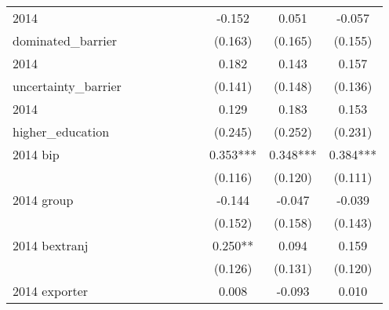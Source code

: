 \begin{table}[htbp]
\begin{tabular}{l*{9}{c}}
2014                &               &               &               &               &               &               &      -0.152   &       0.051   &      -0.057   \\
dominated\_barrier   &               &               &               &               &               &               &     (0.163)   &     (0.165)   &     (0.155)   \\
2014                &               &               &               &               &               &               &       0.182   &       0.143   &       0.157   \\
uncertainty\_barrier &               &               &               &               &               &               &     (0.141)   &     (0.148)   &     (0.136)   \\
2014                &               &               &               &               &               &               &       0.129   &       0.183   &       0.153   \\
higher\_education    &               &               &               &               &               &               &     (0.245)   &     (0.252)   &     (0.231)   \\
2014 bip            &               &               &               &               &               &               &       0.353***&       0.348***&       0.384***\\
                    &               &               &               &               &               &               &     (0.116)   &     (0.120)   &     (0.111)   \\
2014 group          &               &               &               &               &               &               &      -0.144   &      -0.047   &      -0.039   \\
                    &               &               &               &               &               &               &     (0.152)   &     (0.158)   &     (0.143)   \\
2014 bextranj       &               &               &               &               &               &               &       0.250** &       0.094   &       0.159   \\
                    &               &               &               &               &               &               &     (0.126)   &     (0.131)   &     (0.120)   \\
2014 exporter       &               &               &               &               &               &               &       0.008   &      -0.093   &       0.010   \\

\end{tabular}
\end{table}
